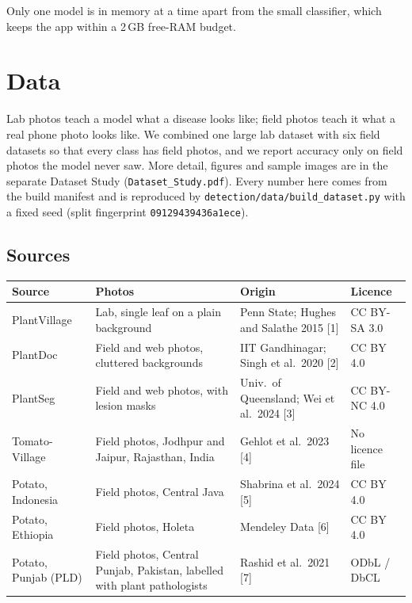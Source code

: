 \documentclass[11pt,a4paper]{article}
\newcommand{\hdr}[1]{\textbf{#1}}
\begin{document}
Only one model is in memory at a time apart from the small classifier, which
keeps the app within a 2\,GB free-RAM budget.

\section{Data}

Lab photos teach a model what a disease looks like; field photos teach it what a
real phone photo looks like. We combined one large lab dataset with six field
datasets so that every class has field photos, and we report accuracy only on
field photos the model never saw. More detail, figures and sample images are in
the separate Dataset Study (\texttt{Dataset\_Study.pdf}). Every number here comes
from the build manifest and is reproduced by
\texttt{detection/data/build\_dataset.py} with a fixed seed (split fingerprint
\texttt{09129439436a1ece}).

\subsection{Sources}

\begin{table}[H]
\centering
\small
\begin{tabularx}{\textwidth}{@{}l L L l@{}}
\toprule
\hdr{Source} & \hdr{Photos} & \hdr{Origin} & \hdr{Licence} \\
\midrule
PlantVillage & Lab, single leaf on a plain background & Penn State; Hughes and Salathe 2015 [1] & CC BY-SA 3.0 \\
PlantDoc & Field and web photos, cluttered backgrounds & IIT Gandhinagar; Singh et al.\ 2020 [2] & CC BY 4.0 \\
PlantSeg & Field and web photos, with lesion masks & Univ.\ of Queensland; Wei et al.\ 2024 [3] & CC BY-NC 4.0 \\
Tomato-Village & Field photos, Jodhpur and Jaipur, Rajasthan, India & Gehlot et al.\ 2023 [4] & No licence file \\
Potato, Indonesia & Field photos, Central Java & Shabrina et al.\ 2024 [5] & CC BY 4.0 \\
Potato, Ethiopia & Field photos, Holeta & Mendeley Data [6] & CC BY 4.0 \\
Potato, Punjab (PLD) & Field photos, Central Punjab, Pakistan, labelled with plant pathologists & Rashid et al.\ 2021 [7] & ODbL / DbCL \\
\bottomrule
\end{tabularx}
\end{table}
\end{document}
